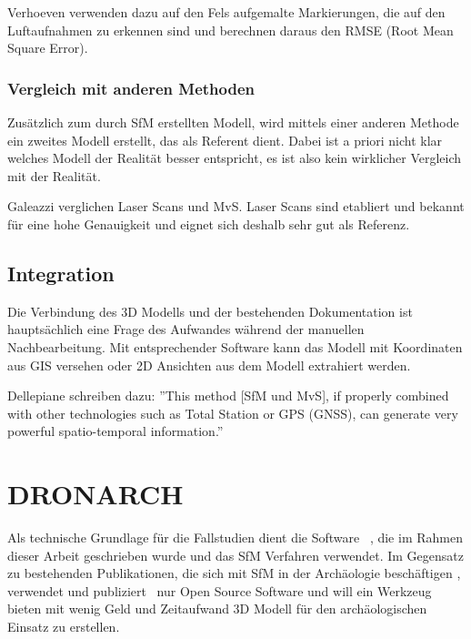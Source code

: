 				Verhoeven \etal \cite{ARCM:ARCM667} verwenden dazu auf den Fels aufgemalte Markierungen, die auf den Luftaufnahmen zu erkennen sind und berechnen daraus den RMSE (Root Mean Square Error).

			\subsubsection{Vergleich mit anderen Methoden}
				Zusätzlich zum durch SfM erstellten Modell, wird mittels einer anderen Methode ein zweites Modell erstellt, das als Referent dient. Dabei ist a priori nicht klar welches Modell der Realität besser entspricht, es ist also kein wirklicher Vergleich mit der Realität.
				
				Galeazzi \etal \cite{arch:laser_vs_dense_stereo} verglichen Laser Scans und MvS. Laser Scans sind etabliert und bekannt für eine hohe Genauigkeit und eignet sich deshalb sehr gut als Referenz.
			
		\subsection{Integration}
			Die Verbindung des 3D Modells und der bestehenden Dokumentation ist hauptsächlich eine Frage des Aufwandes während der manuellen Nachbearbeitung. Mit entsprechender Software kann das Modell mit Koordinaten aus GIS versehen oder 2D Ansichten aus dem Modell extrahiert werden.
			
			Dellepiane \etal schreiben dazu: ''This method [SfM und MvS], if properly combined with other technologies such as Total Station or GPS (GNSS), can generate very powerful spatio-temporal information.'' \cite{arch:dens_ster_excav}
		
	\section{DRONARCH}
		Als technische Grundlage für die Fallstudien dient die Software \dronarch\ \cite{dronarch:github}, die im Rahmen dieser Arbeit geschrieben wurde und das SfM Verfahren verwendet.
		Im Gegensatz zu bestehenden Publikationen, die sich mit SfM in der Archäologie beschäftigen \cite{arch:laser_vs_dense_stereo, ARCM:ARCM667, ARP:ARP399, TUW-210216, DeReu20131108, the_cave, altai}, verwendet und publiziert \dronarch\ nur Open Source Software und will ein Werkzeug bieten mit wenig Geld und Zeitaufwand 3D Modell für den archäologischen Einsatz zu erstellen.

	